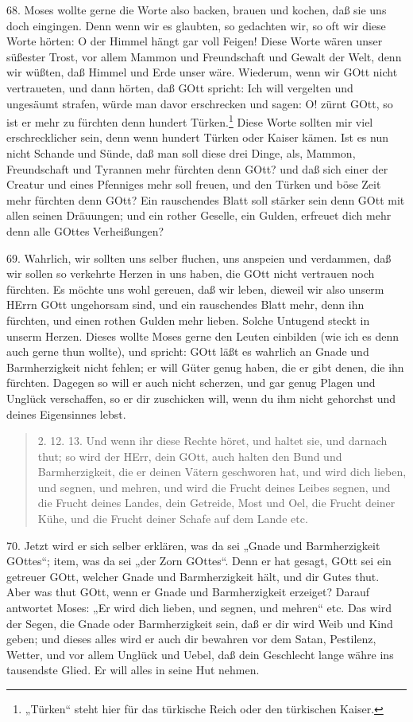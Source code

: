 68. Moses wollte gerne die Worte also backen, brauen und kochen, daß sie uns doch eingingen. Denn wenn wir es glaubten, so gedachten wir, so oft wir diese Worte hörten: O der Himmel hängt gar voll Feigen! Diese Worte wären unser süßester Trost, vor allem Mammon und Freundschaft und Gewalt der Welt, denn wir wüßten, daß Himmel und Erde unser wäre. Wiederum, wenn wir GOtt nicht vertraueten, und dann hörten, daß GOtt spricht: Ich will vergelten und ungesäumt strafen, würde man davor erschrecken und sagen: O! zürnt GOtt, so ist er mehr zu fürchten denn hundert Türken.\footnote{„Türken“ steht hier für das türkische Reich oder den türkischen Kaiser.} Diese Worte sollten mir viel erschrecklicher sein, denn wenn hundert Türken oder Kaiser kämen. Ist es nun nicht Schande und Sünde, daß man soll diese drei Dinge, als, Mammon, Freundschaft und Tyrannen mehr fürchten denn GOtt? und daß sich einer der Creatur und eines Pfenniges mehr soll freuen, und den Türken und böse Zeit mehr fürchten denn GOtt? Ein rauschendes Blatt soll stärker sein denn GOtt mit allen seinen Dräuungen; und ein rother Geselle, ein Gulden, erfreuet dich mehr denn alle GOttes Verheißungen?

69. Wahrlich, wir sollten uns selber fluchen, uns anspeien und verdammen, daß wir sollen so verkehrte Herzen in uns haben, die GOtt nicht vertrauen noch fürchten. Es möchte uns wohl gereuen, daß wir leben, dieweil wir also unserm HErrn GOtt ungehorsam sind, und ein rauschendes Blatt mehr, denn ihn fürchten, und einen rothen Gulden mehr lieben. Solche Untugend steckt in unserm Herzen. Dieses wollte Moses gerne den Leuten einbilden (wie ich es denn auch gerne thun wollte), und spricht: GOtt läßt es wahrlich an Gnade und Barmherzigkeit nicht fehlen; er will Güter genug haben, die er gibt denen, die ihn fürchten. Dagegen so will er auch nicht scherzen, und gar genug Plagen und Unglück verschaffen, so er dir zuschicken will, wenn du ihm nicht gehorchst und deines Eigensinnes lebst.

\begin{quote}
2. 12. 13. Und wenn ihr diese Rechte höret, und haltet sie, und darnach thut; so wird der HErr, dein GOtt, auch halten den Bund und Barmherzigkeit, die er deinen Vätern geschworen hat, und wird dich lieben, und segnen, und mehren, und wird die Frucht deines Leibes segnen, und die Frucht deines Landes, dein Getreide, Most und Oel, die Frucht deiner Kühe, und die Frucht deiner Schafe auf dem Lande etc.
\end{quote}

70. Jetzt wird er sich selber erklären, was da sei „Gnade und Barmherzigkeit GOttes“; item, was da sei „der Zorn GOttes“. Denn er hat gesagt, GOtt sei ein getreuer GOtt, welcher Gnade und Barmherzigkeit hält, und dir Gutes thut. Aber was thut GOtt, wenn er Gnade und Barmherzigkeit erzeiget? Darauf antwortet Moses: „Er wird dich lieben, und segnen, und mehren“ etc. Das wird der Segen, die Gnade oder Barmherzigkeit sein, daß er dir wird Weib und Kind geben; und dieses alles wird er auch dir bewahren vor dem Satan, Pestilenz, Wetter, und vor allem Unglück und Uebel, daß dein Geschlecht lange währe ins tausendste Glied. Er will alles in seine Hut nehmen.


